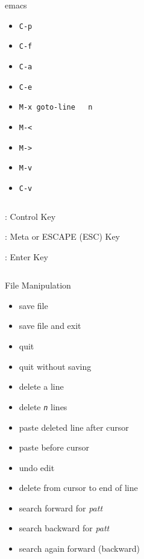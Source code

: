 \documentclass[10pt,t]{beamer}
\begin{document}
\begin{frame}[allowframebreaks]
{\begin{columns}
\begin{exampleblock}{emacs}
\begin{itemize}
      \item \texttt{C-p}
      \item \texttt{C-f}
      \item \texttt{C-a}
      \item \texttt{C-e}
      \item \texttt{M-x goto-line \enter\, n}
      \item \texttt{M-<}
      \item \texttt{M->}
      \item \texttt{M-v}
      \item \texttt{C-v}
    \end{itemize}
    \end{exampleblock}
  \end{columns}
  }
  \vspace{-0.1cm}
  \begin{columns}
    \begin{itemize}
      {\scriptsize
      \item[C]: Control Key
      \item[M]: Meta or ESCAPE (ESC) Key
      \item[{\enter}]: Enter Key
      }
    \end{itemize}
  \end{columns}
  \framebreak
  {\scriptsize
   \begin{columns}
     \vspace{-0.5cm}
    \begin{exampleblock}{File Manipulation}
    \begin{itemize}
      \item save file
      \item save file and exit
      \item quit
      \item quit without saving
      \item delete a line
      \item delete \texttt{\textit{n}} lines
      \item paste deleted line after cursor
      \item paste before cursor
      \item undo edit
      \item delete from cursor to end of line
      \item search forward for \textit{patt}
      \item search backward for \textit{patt}
      \item search again forward (backward)

\end{itemize}
\end{exampleblock}
\end{columns}}
\end{frame}
\end{document}
